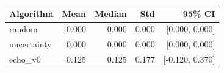 \begin{tabular}{lrrrr}
\hline
Algorithm & Mean & Median & Std & 95\% CI \\
\hline
random & 0.000 & 0.000 & 0.000 & [0.000, 0.000] \\
uncertainty & 0.000 & 0.000 & 0.000 & [0.000, 0.000] \\
echo\_v0 & 0.125 & 0.125 & 0.177 & [-0.120, 0.370] \\
\hline
\end{tabular}
